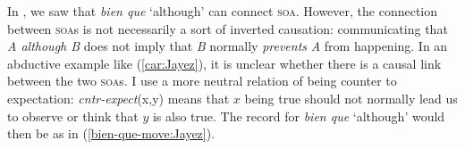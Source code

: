 \documentclass[output=paper,colorlinks,citecolor=brown]{langscibook}
\begin{document}

In , we saw that \textit{bien que} `although' can connect \textsc{soa}. However, the connection between \textsc{soa}s is not necessarily a sort of inverted causation: communicating that \textit{A although B} does not imply that \textit{B} normally \textit{prevents} \textit{A} from happening. In an abductive example like (\ref{car:Jayez}), it is unclear whether there is a causal link between the two \textsc{soa}s. I use a more neutral relation of being counter to expectation: \textit{cntr-expect}(x,y) means that $x$ being true should not normally lead us to observe or think that $y$ is also true. The record for \textit{bien que} `although' would then be as in (\ref{bien-que-move:Jayez}).
\end{document}
